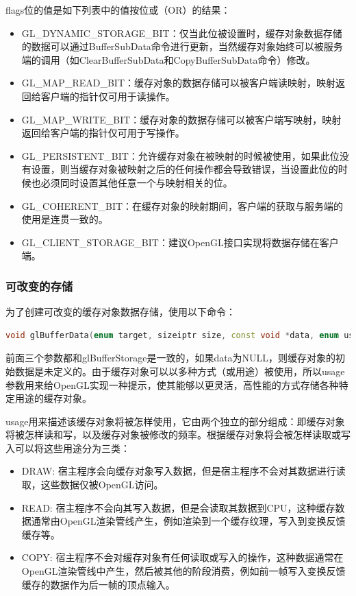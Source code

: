 flags位的值是如下列表中的值按位或（OR）的结果：

\begin{itemize}
	\item GL\_DYNAMIC\_STORAGE\_BIT：仅当此位被设置时，缓存对象数据存储的数据可以通过BufferSubData命令进行更新，当然缓存对象始终可以被服务端的调用（如ClearBufferSubData和CopyBufferSubData命令）修改。
	\item GL\_MAP\_READ\_BIT：缓存对象的数据存储可以被客户端读映射，映射返回给客户端的指针仅可用于读操作。
	\item GL\_MAP\_WRITE\_BIT：缓存对象的数据存储可以被客户端写映射，映射返回给客户端的指针仅可用于写操作。 
	\item GL\_PERSISTENT\_BIT：允许缓存对象在被映射的时候被使用，如果此位没有设置，则当缓存对象被映射之后的任何操作都会导致错误，当设置此位的时候也必须同时设置其他任意一个与映射相关的位。 
	\item GL\_COHERENT\_BIT：在缓存对象的映射期间，客户端的获取与服务端的使用是连贯一致的。
	\item GL\_CLIENT\_STORAGE\_BIT：建议OpenGL接口实现将数据存储在客户端。
\end{itemize}




\subsubsection{可改变的存储}
为了创建可改变的缓存对象数据存储，使用以下命令：

\begin{lstlisting}[language=C++]
void glBufferData​(enum target, sizeiptr size, const void *data, enum usage);
\end{lstlisting}

前面三个参数都和glBufferStorage是一致的，如果data为NULL，则缓存对象的初始数据是未定义的。由于缓存对象可以以多种方式（或用途）被使用，所以usage参数用来给OpenGL实现一种提示，使其能够以更灵活，高性能的方式存储各种特定用途的缓存对象。

usage用来描述该缓存对象将被怎样使用，它由两个独立的部分组成：即缓存对象将被怎样读和写，以及缓存对象被修改的频率。根据缓存对象将会被怎样读取或写入可以将这些用途分为三类：

\begin{itemize}
	\item DRAW: 宿主程序会向缓存对象写入数据，但是宿主程序不会对其数据进行读取，这些数据仅被OpenGL访问。
	\item READ: 宿主程序不会向其写入数据，但是会读取其数据到CPU，这种缓存数据通常由OpenGL渲染管线产生，例如渲染到一个缓存纹理，写入到变换反馈缓存等。
	\item COPY: 宿主程序不会对缓存对象有任何读取或写入的操作，这种数据通常在OpenGL渲染管线中产生，然后被其他的阶段消费，例如前一帧写入变换反馈缓存的数据作为后一帧的顶点输入。
\end{itemize}

